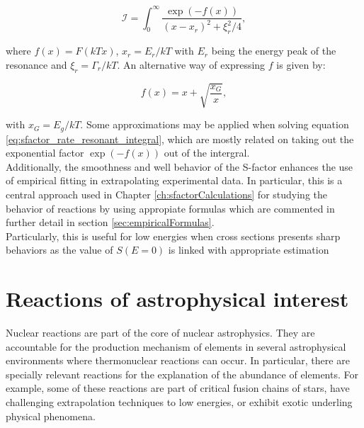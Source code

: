 \documentclass[openany]{book}
\begin{document}
 \begin{equation}\label{eq:sfactor_rate_resonant_integral}
	 \mathcal{I} = \int_{0}^{\infty} {\frac{\exp{(-f(x))}}{(x-x_r)^2 + \xi^2_r/4}}, 
\end{equation}

where $f(x) = F(kTx)$, $x_r = E_r/kT$ with $E_r$ being the energy peak of the resonance and $\xi_r = \Gamma_r/kT$. An alternative way of expressing $f$ is given by:

\begin{equation}\label{eq:sfactor_rate_resonant_f}
	f(x) = x + \sqrt{\frac{x_G}{x}}, 
\end{equation}

with $x_G = E_g/kT$. Some approximations may be applied when solving equation \ref{eq:sfactor_rate_resonant_integral}, which are mostly related on taking out the exponential factor  $\exp{(-f(x))}$ out of the intergral. \\



Additionally, the smoothness and well behavior of the S-factor enhances the use of empirical fitting in extrapolating experimental data. In particular, this is a central approach used in Chapter \ref{ch:sfactorCalculations} for studying the behavior of reactions by using appropiate formulas which are commented in further detail in section \ref{sec:empiricalFormulas}.  \\

Particularly, this is useful for low energies when cross sections presents sharp behaviors as the value of $S(E = 0)$ is linked with appropriate estimation  \\


\chapter{Reactions of astrophysical interest}  \label{ch:reactionsInterest}

Nuclear reactions are part of the core of nuclear astrophysics. They are accountable for the production mechanism of elements in several astrophysical environments where thermonuclear reactions can occur. In particular, there are specially relevant reactions for the explanation of the abundance of elements. For example, some of these reactions are part of critical fusion chains of stars, have challenging extrapolation techniques to low energies, or  exhibit exotic underling physical phenomena.   \\
\end{document}
